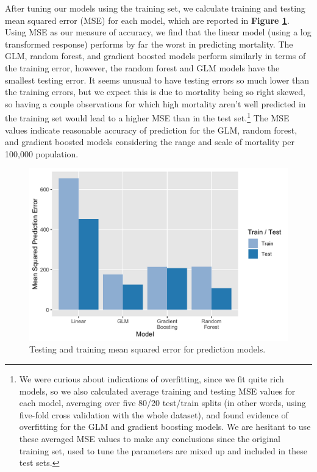 \documentclass[letterpaper, 11pt]{article}
\begin{document}
After tuning our models using the training set, we calculate training and testing mean squared error (MSE) for each model, which are reported in \textbf{Figure \ref{fig:mod_err2}}. Using MSE as our measure of accuracy, we find that the linear model (using a log transformed response) performs by far the worst in predicting mortality. The GLM, random forest, and gradient boosted models perform similarly in terms of the training error, however, the random forest and GLM models have the smallest testing error. It seems unusual to have testing errors so much lower than the training errors, but we expect this is due to mortality being so right skewed, so having a couple observations for which high mortality aren't well predicted in the training set would lead to a higher MSE than in the test set.\footnote{We were curious about indications of overfitting, since we fit quite rich models, so we also calculated average training and testing MSE values for each model, averaging over five 80/20 test/train splits (in other words, using five-fold cross validation with the whole dataset), and found evidence of overfitting for the GLM and gradient boosting models. We are hesitant to use these averaged MSE values to make any conclusions since the original training set, used to tune the parameters are mixed up and included in these test sets.} The MSE values indicate reasonable accuracy of prediction for the GLM, random forest, and gradient boosted models considering the range and scale of mortality per 100,000 population.

\begin{figure}[ht]
    \centering
    \includegraphics[width = .5\textwidth]{../figures/mod_errs2.png}
    \caption{Testing and training mean squared error for prediction models.}
    \label{fig:mod_err2}
\end{figure}
\end{document}
